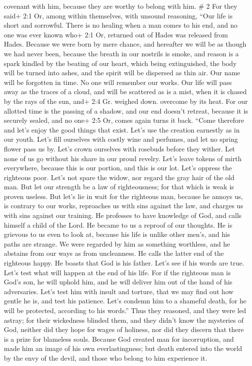 covenant with him, because they are worthy to belong with him. \# 2
 For they said+ 2:1 Or, among within themselves, with
unsound reasoning, ``Our life is short and sorrowful. There is no
healing when a man comes to his end, and no one was ever known who+ 2:1
Or, returned out of Hades was released from Hades.  Because
we were born by mere chance, and hereafter we will be as though we had
never been, because the breath in our nostrils is smoke, and reason is a
spark kindled by the beating of our heart,  which being
extinguished, the body will be turned into ashes, and the spirit will be
dispersed as thin air.  Our name will be forgotten in time.
No one will remember our works. Our life will pass away as the traces of
a cloud, and will be scattered as is a mist, when it is chased by the
rays of the sun, and+ 2:4 Gr. weighed down. overcome by its heat.
 For our allotted time is the passing of a shadow, and our
end doesn't retreat, because it is securely sealed, and no one+ 2:5 Or,
comes again turns it back.  ``Come therefore and let's enjoy
the good things that exist. Let's use the creation earnestly as in our
youth.  Let's fill ourselves with costly wine and perfumes,
and let no spring flower pass us by.  Let's crown ourselves
with rosebuds before they wither.  Let none of us go without
his share in our proud revelry. Let's leave tokens of mirth everywhere,
because this is our portion, and this is our lot.  Let's
oppress the righteous poor. Let's not spare the widow, nor regard the
gray hair of the old man.  But let our strength be a law of
righteousness; for that which is weak is proven useless. 
But let's lie in wait for the righteous man, because he annoys us, is
contrary to our works, reproaches us with sins against the law, and
charges us with sins against our training.  He professes to
have knowledge of God, and calls himself a child of the Lord.
 He became to us a reproof of our thoughts. 
He is grievous to us even to look at, because his life is unlike other
men's, and his paths are strange.  We were regarded by him
as something worthless, and he abstains from our ways as from
uncleanness. He calls the latter end of the righteous happy. He boasts
that God is his father.  Let's see if his words are true.
Let's test what will happen at the end of his life.  For if
the righteous man is God's son, he will uphold him, and he will deliver
him out of the hand of his adversaries.  Let's test him
with insult and torture, that we may find out how gentle he is, and test
his patience.  Let's condemn him to a shameful death, for
he will be protected, according to his words.''  Thus they
reasoned, and they were led astray; for their wickedness blinded them,
 and they didn't know the mysteries of God, neither did
they hope for wages of holiness, nor did they discern that there is a
prize for blameless souls.  Because God created man for
incorruption, and made him an image of his own everlastingness;
 but death entered into the world by the envy of the devil,
and those who belong to him experience it.

